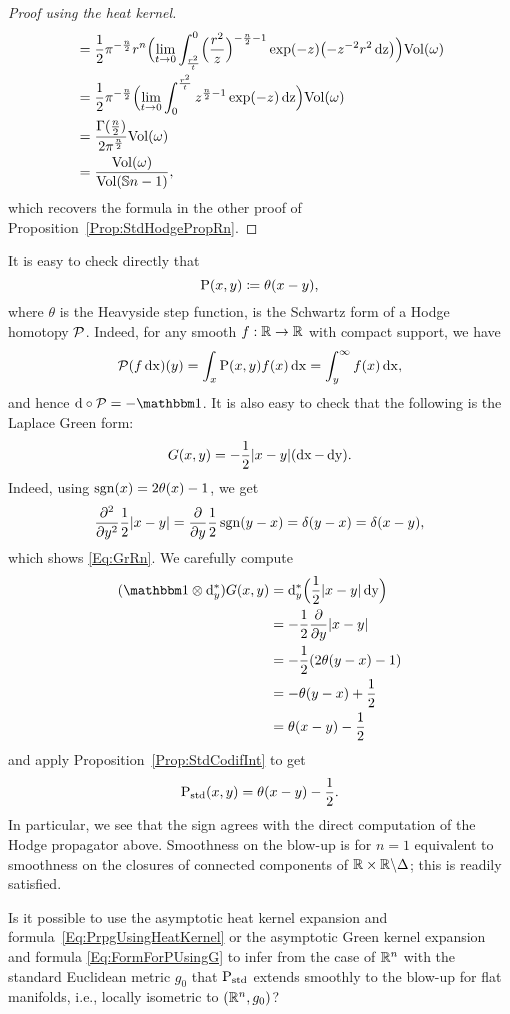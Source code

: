 \documentclass[\MainFolder/Text.tex]{subfiles}
\begin{document}
\begin{proof}[Proof using the heat kernel]
\begin{align*}
&=\frac{1}{2}\pi^{-\frac{n}{2}}r^n \Bigl(\lim_{t\to 0}\int_{\frac{r^2}{t}}^0 \Bigl(\frac{r^2}{z}\Bigr)^{-\frac{n}{2} - 1}\exp(-z)\bigl(-z^{-2}r^2\operatorname{dz}\bigr)\Bigr)\mathrm{Vol}(\omega)\\
&= \frac{1}{2}\pi^{-\frac{n}{2}}\Bigl(\lim_{t\to 0} \int_0^{\frac{r^2}{t}} z^{\frac{n}{2}-1} \exp(-z) \operatorname{dz}\Bigr)\mathrm{Vol}(\omega) \\
&= \frac{\Gamma(\frac{n}{2})}{2\pi^{\frac{n}{2}}}\mathrm{Vol}(\omega) \\
& = \frac{\mathrm{Vol}(\omega)}{\mathrm{Vol}(\mathbb{S}{n-1})},
\end{align*}
which recovers the formula in the other proof of Proposition~\ref{Prop:StdHodgePropRn}.
\end{proof}

\begin{Example}[The case $n=1$]\label{Ex:SDFSDF}
It is easy to check directly that
$$ \mathrm{P}(x,y) \coloneqq \theta(x-y), $$
where $\theta$ is the Heavyside step function, is the Schwartz form of a Hodge homotopy $\mathcal{P}$. Indeed, for any smooth $f: \mathbb{R}\rightarrow\mathbb{R}$ with compact support, we have 
$$ \mathcal{P}(f \operatorname{dx})(y) = \int_x \mathrm{P}(x,y)f(x)\operatorname{dx} = \int_{y}^{\infty} f(x)\operatorname{dx}, $$
and hence $\Dd\circ\Htp = -\Id$. It is also easy to check that the following is the Laplace Green form:
$$ G(x,y) = - \frac{1}{2}|x-y|(\operatorname{dx}-\operatorname{dy}). $$
Indeed, using $\operatorname{sgn}(x) = 2\theta(x) - 1$, we get
$$ \frac{\partial^2}{\partial y^2} \frac{1}{2}|x-y| = \frac{\partial}{\partial y}\frac{1}{2}\operatorname{sgn}(y-x) = \delta(y-x) = \delta(x-y), $$
which shows \eqref{Eq:GrRn}. We carefully compute
\begin{align*}
(\Id\otimes \CoDd_y)\GKer(x,y) & = \CoDd_y \Bigl(\frac{1}{2}\Abs{x-y}\Diff{y}\Bigr) \\
& = -\frac{1}{2} \frac{\partial}{\partial y}\Abs{x-y} \\
& = -\frac{1}{2}(2\theta(y-x)-1) \\ 
& = - \theta(y-x) + \frac{1}{2} \\
& = \theta(x-y) - \frac{1}{2}
\end{align*}
and apply Proposition~\ref{Prop:StdCodifInt} to get
$$ \mathrm{P}_{\mathrm{std}}(x,y) = \theta(x-y) - \frac{1}{2}. $$
In particular, we see that the sign agrees with the direct computation of the Hodge propagator above. Smoothness on the blow-up is for $n=1$ equivalent to smoothness on the closures of connected components of $\mathbb{R}\times\mathbb{R}\backslash\Delta$; this is readily satisfied. 
\end{Example}

\begin{Question}
	Is it possible to use the asymptotic heat kernel expansion and formula~\eqref{Eq:PrpgUsingHeatKernel} or the asymptotic Green kernel expansion and formula \eqref{Eq:FormForPUsingG} to infer from the case of $\mathbb{R}^n$ with the standard Euclidean metric $g_0$ that $\mathrm{P}_{\mathrm{std}}$ extends smoothly to the blow-up for flat manifolds, i.e., locally isometric to $(\mathbb{R}^n,g_0)$?  
\end{Question}


\end{document}
